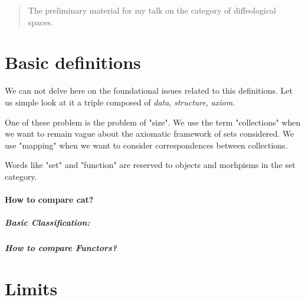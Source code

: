 \documentclass[a4paper,12pt,fleqn]{scrartcl}  %
\begin{document}
 
\begin{abstract}
	The preliminary material for my talk on the category of diffeological spaces.
\end{abstract}


\begin{appendices}

\section{Basic definitions}
	
We can not delve here on the foundational issues related to this definitions. Let us simple look at it a triple composed of \emph{data}, \emph{structure}, \emph{axiom}.

One of these problem is the problem of "size". We use the term "collections" when we want to remain vague about the axiomatic framework of sets considered.
We use "mapping" when we want to consider correspondences between collections.

Words like "set" and "function" are reserved to objects and morhpisms in the set category.

\paragraph{How to compare cat?}
	

	\subparagraph{Basic Classification:}
	

\subparagraph{How to compare Functors?}
	

\section{Limits}


\begin{minipage}[t]{0.5\textwidth}
	\begin{definition}[Cone on $D$]
		
	\end{definition}
\end{minipage}
\begin{minipage}[t]{0.5\textwidth}
	\begin{definition}[Co-Cone on $D$]
	
	\end{definition}
\end{minipage}


\end{appendices}
\end{document}

